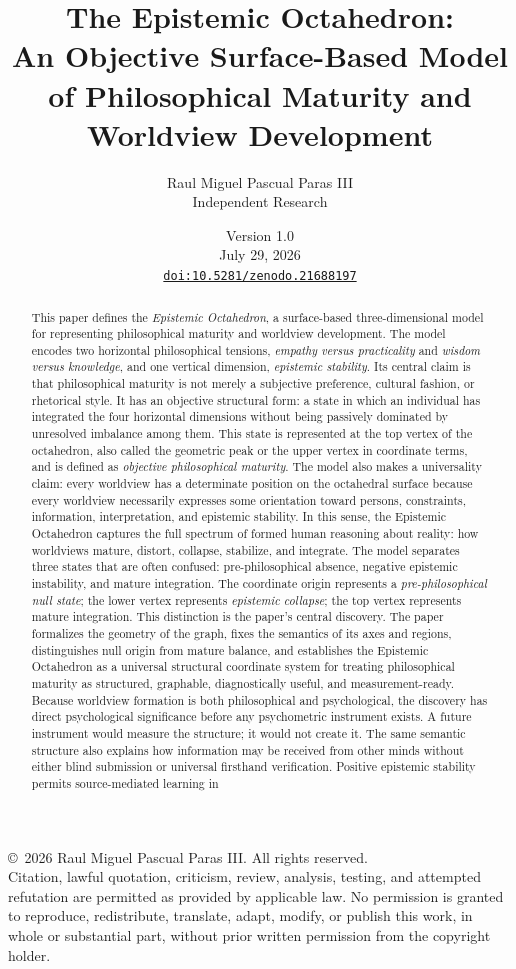 \documentclass[11pt]{article}
\title{The Epistemic Octahedron:\\
An Objective Surface-Based Model of Philosophical Maturity and Worldview Development}
\author{Raul Miguel Pascual Paras III\\
\small Independent Research}
\date{Version 1.0\\
July 29, 2026\\[0.45em]
\href{https://doi.org/10.5281/zenodo.21688197}{\texttt{doi:10.5281/zenodo.21688197}}}
\begin{document}
\maketitle

\begin{center}
\small
\copyright\ 2026 Raul Miguel Pascual Paras III. All rights reserved.\\
Citation, lawful quotation, criticism, review, analysis, testing, and attempted refutation are permitted as provided by applicable law. No permission is granted to reproduce, redistribute, translate, adapt, modify, or publish this work, in whole or substantial part, without prior written permission from the copyright holder.
\end{center}

\begin{abstract}
This paper defines the \emph{Epistemic Octahedron}, a surface-based three-dimensional model for representing philosophical maturity and worldview development. The model encodes two horizontal philosophical tensions, \emph{empathy versus practicality} and \emph{wisdom versus knowledge}, and one vertical dimension, \emph{epistemic stability}. Its central claim is that philosophical maturity is not merely a subjective preference, cultural fashion, or rhetorical style. It has an objective structural form: a state in which an individual has integrated the four horizontal dimensions without being passively dominated by unresolved imbalance among them. This state is represented at the top vertex of the octahedron, also called the geometric peak or the upper vertex in coordinate terms, and is defined as \emph{objective philosophical maturity}. The model also makes a universality claim: every worldview has a determinate position on the octahedral surface because every worldview necessarily expresses some orientation toward persons, constraints, information, interpretation, and epistemic stability. In this sense, the Epistemic Octahedron captures the full spectrum of formed human reasoning about reality: how worldviews mature, distort, collapse, stabilize, and integrate. The model separates three states that are often confused: pre-philosophical absence, negative epistemic instability, and mature integration. The coordinate origin represents a \emph{pre-philosophical null state}; the lower vertex represents \emph{epistemic collapse}; the top vertex represents mature integration. This distinction is the paper's central discovery. The paper formalizes the geometry of the graph, fixes the semantics of its axes and regions, distinguishes null origin from mature balance, and establishes the Epistemic Octahedron as a universal structural coordinate system for treating philosophical maturity as structured, graphable, diagnostically useful, and measurement-ready. Because worldview formation is both philosophical and psychological, the discovery has direct psychological significance before any psychometric instrument exists. A future instrument would measure the structure; it would not create it. The same semantic structure also explains how information may be received from other minds without either blind submission or universal firsthand verification. Positive epistemic stability permits source-mediated learning in 
\end{abstract}
\end{document}
